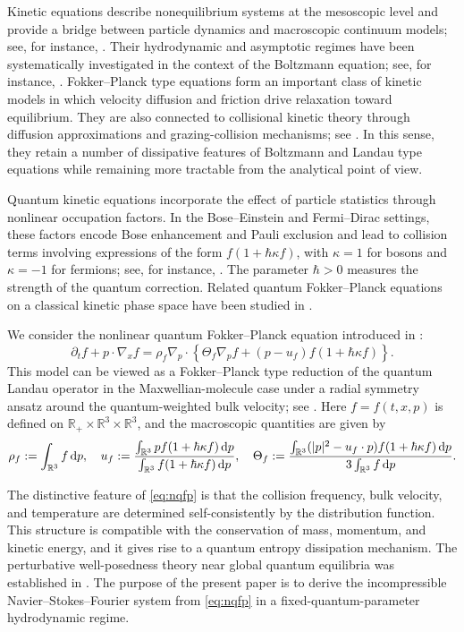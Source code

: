 \documentclass[10pt,reqno]{amsart}
\numberwithin{equation}{section}
\newcommand{\lt}{\left}
\newcommand{\rt}{\right}
\newcommand{\mR}{\mathbb{R}}
\newcommand{\intr}{\int_{\mR^3}}
\newcommand{\R}{\mathbb R}
\newcommand{\bq}{\begin{equation}}
\newcommand{\eq}{\end{equation}}
\newcommand{\pa}{\partial}
\newcommand{\rdp}{\textnormal{d}p}
\begin{document}
 
Kinetic equations describe nonequilibrium systems at the mesoscopic level and provide a bridge between particle dynamics and macroscopic continuum models; see, for instance, \cite{CIP94,Vil02}. Their hydrodynamic and asymptotic regimes have been systematically investigated in the context of the Boltzmann equation; see, for instance, \cite{BGL91,BGL93,SR09}. Fokker--Planck type equations form an important class of kinetic models in which velocity diffusion and friction drive relaxation toward equilibrium. They are also connected to collisional kinetic theory through diffusion approximations and grazing-collision mechanisms; see \cite{DR01,Gou97,Vil98}. In this sense, they retain a number of dissipative features of Boltzmann and Landau type equations while remaining more tractable from the analytical point of view.
 
 
Quantum kinetic equations incorporate the effect of particle statistics through nonlinear occupation factors. In the Bose--Einstein and Fermi--Dirac settings, these factors encode Bose enhancement and Pauli exclusion and lead to collision terms involving expressions of the form $f(1+\hbar\kappa f)$, with $\kappa=1$ for bosons and $\kappa=-1$ for fermions; see, for instance, \cite{Kan95}. The parameter $\hbar>0$ measures the strength of the quantum correction. Related quantum Fokker--Planck equations on a classical kinetic phase space have been studied in \cite{LZ15,NS07}. 
 

We consider the nonlinear quantum Fokker--Planck equation introduced in \cite{CHHpre}:
\bq\label{eq:nqfp}
\pa_t f+p\cdot\nabla_x f = \rho_f\nabla_p\cdot\lt\{\Theta_f\nabla_p f+(p-u_f)f(1+\hbar\kappa f)\rt\}.
\eq
This model can be viewed as a Fokker--Planck type reduction of the quantum Landau operator in the Maxwellian-molecule case under a radial symmetry ansatz around the quantum-weighted bulk velocity; see \cite{CHHpre}.
Here $f=f(t,x,p)$ is defined on $\R_+\times\R^3\times\R^3$, and the macroscopic quantities are given by
\bq\label{eq:macro-fields}
\rho_f:=\intr f\,\rdp,\quad
u_f:=\frac{\intr pf(1+\hbar\kappa f)\,\rdp}{\intr f(1+\hbar\kappa f)\,\rdp},\quad
\Theta_f:=\frac{\intr (|p|^2-u_f\cdot p)f(1+\hbar\kappa f)\,\rdp}{3\intr f\,\rdp}.
\eq

The distinctive feature of \eqref{eq:nqfp} is that the collision frequency, bulk velocity, and temperature are determined self-consistently by the distribution function. This structure is compatible with the conservation of mass, momentum, and kinetic energy, and it gives rise to a quantum entropy dissipation mechanism. The perturbative well-posedness theory near global quantum equilibria was established in \cite{CHHpre}. The purpose of the present paper is to derive the incompressible Navier--Stokes--Fourier system from \eqref{eq:nqfp} in a fixed-quantum-parameter hydrodynamic regime.
\end{document}
